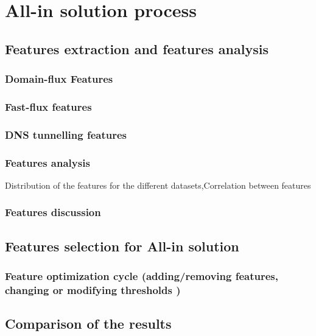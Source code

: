 
\chapter{All-in solution process} %

\label{All-in solution process} %

\section{Features extraction and features analysis}
\subsection{Domain-flux Features}
\subsection{Fast-flux features}
\subsection{DNS tunnelling features}
\subsection{Features analysis}
Distribution of the features for the different datasets,Correlation between features
\subsection{Features discussion}
\section{Features selection for All-in solution}
\subsection{Feature optimization cycle (adding/removing features, changing or modifying thresholds )}
\section{Comparison of the results}
